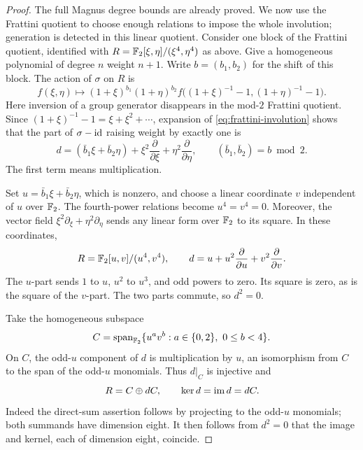 \begin{proof}
The full Magnus degree bounds are already proved. We now use the
Frattini quotient to choose enough relations to impose the whole
involution; generation is detected in this linear quotient.
Consider one block of the Frattini quotient, identified with
\(R=\mathbb F_2[\xi,\eta]/(\xi^4,\eta^4)\) as above.
Give a homogeneous polynomial of degree \(n\) weight \(n+1\).
Write \(b=(b_1,b_2)\) for the shift of this block.
The action of \(\sigma\) on \(R\) is
\begin{equation}\label{eq:frattini-involution}
 f(\xi,\eta)\longmapsto
 (1+\xi)^{b_1}(1+\eta)^{b_2}
 f\bigl((1+\xi)^{-1}-1,(1+\eta)^{-1}-1\bigr).
\end{equation}
Here inversion of a group generator disappears in the mod-\(2\)
Frattini quotient.  Since
\((1+\xi)^{-1}-1=\xi+\xi^2+\cdots\), expansion of
\eqref{eq:frattini-involution} shows that the part of
\(\sigma-\operatorname{id}\) raising weight by exactly one is
\begin{equation}\label{eq:frattini-differential}
 d=(\bar b_1\xi+\bar b_2\eta)
       +\xi^2\frac{\partial}{\partial\xi}
       +\eta^2\frac{\partial}{\partial\eta},
 \qquad (\bar b_1,\bar b_2)=b\bmod2.
\end{equation}
The first term means multiplication.

Set \(u=\bar b_1\xi+\bar b_2\eta\), which is nonzero, and choose a
linear coordinate \(v\) independent of \(u\) over \(\mathbb F_2\).
The fourth-power relations become \(u^4=v^4=0\).
Moreover, the vector field
\(\xi^2\partial_\xi+\eta^2\partial_\eta\) sends any linear form
over \(\mathbb F_2\) to its square.  In these coordinates,
\begin{equation}\label{eq:even-coordinate-differential}
 R=\mathbb F_2[u,v]/(u^4,v^4),
 \qquad d=u+u^2\frac{\partial}{\partial u}
                +v^2\frac{\partial}{\partial v}.
\end{equation}
The \(u\)-part sends \(1\) to \(u\), \(u^2\) to \(u^3\), and
odd powers to zero.  Its square is zero, as is the square of the
\(v\)-part.  The two parts commute, so \(d^2=0\).

Take the homogeneous subspace
\begin{equation}\label{eq:even-complement}
 C=\operatorname{span}_{\mathbb F_2}
       \{u^a v^b:a\in\{0,2\},\ 0\le b<4\}.
\end{equation}
On \(C\), the odd-\(u\) component of \(d\) is multiplication by
\(u\), an isomorphism from \(C\) to the span of the odd-\(u\)
monomials.  Thus \(d|_C\) is injective and
\begin{equation}\label{eq:acyclic-frattini}
 R=C\oplus dC,\qquad \ker d=\operatorname{im} d=dC.
\end{equation}
Indeed the direct-sum assertion follows by projecting to the
odd-\(u\) monomials; both summands have dimension eight.
It then follows from \(d^2=0\) that the image and kernel, each of
dimension eight, coincide.


\end{proof}
